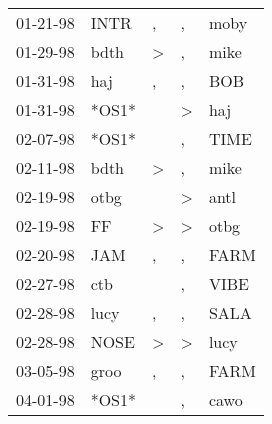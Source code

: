 \begin{supertabular}{p{0.07\textwidth}p{0.06\textwidth}p{0.02\textwidth}p{0.02\textwidth}p{0.06\textwidth}}
          01-21-98\textsuperscript{} &           INTR\textsuperscript{} &             , &                , &  moby\textsuperscript{} \\
          01-29-98\textsuperscript{} &           bdth\textsuperscript{} &  \textgreater &                , &  mike\textsuperscript{} \\
          01-31-98\textsuperscript{} &            haj\textsuperscript{} &             , &                , &   BOB\textsuperscript{} \\
          01-31-98\textsuperscript{} &                            *OS1* &               &     \textgreater &   haj\textsuperscript{} \\
          02-07-98\textsuperscript{} &                            *OS1* &               &                , &  TIME\textsuperscript{} \\
          02-11-98\textsuperscript{} &           bdth\textsuperscript{} &  \textgreater &                , &  mike\textsuperscript{} \\
          02-19-98\textsuperscript{} &           otbg\textsuperscript{} &               &     \textgreater &  antl\textsuperscript{} \\
          02-19-98\textsuperscript{} &             FF\textsuperscript{} &  \textgreater &     \textgreater &  otbg\textsuperscript{} \\
          02-20-98\textsuperscript{} &            JAM\textsuperscript{} &             , &                , &  FARM\textsuperscript{} \\
          02-27-98\textsuperscript{} &            ctb\textsuperscript{} &               &                , &  VIBE\textsuperscript{} \\
          02-28-98\textsuperscript{} &           lucy\textsuperscript{} &             , &                , &  SALA\textsuperscript{} \\
          02-28-98\textsuperscript{} &           NOSE\textsuperscript{} &  \textgreater &     \textgreater &  lucy\textsuperscript{} \\
          03-05-98\textsuperscript{} &           groo\textsuperscript{} &             , &                , &  FARM\textsuperscript{} \\
          04-01-98\textsuperscript{} &                            *OS1* &               &                , &  cawo\textsuperscript{} \\

\end{supertabular}
